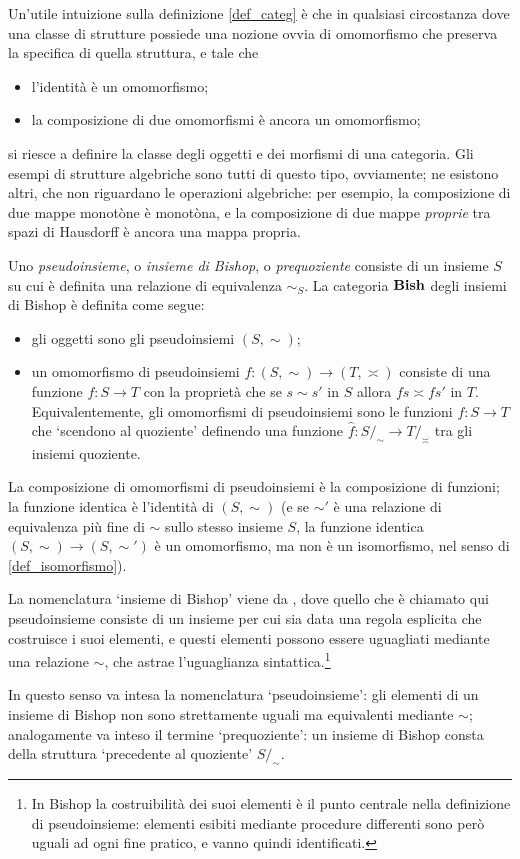 Un'utile intuizione sulla definizione \ref{def_categ} è che in qualsiasi circostanza dove una classe di strutture possiede una nozione ovvia di omomorfismo che preserva la specifica di quella struttura, e tale che
\begin{itemize}
	\item l'identità è un omomorfismo;
	\item la composizione di due omomorfismi è ancora un omomorfismo;
\end{itemize}
si riesce a definire la classe degli oggetti e dei morfismi di una categoria. Gli esempi di strutture algebriche sono tutti di questo tipo, ovviamente; ne esistono altri, che non riguardano le operazioni algebriche: per esempio, la composizione di due mappe monotòne è monotòna, e la composizione di due mappe \emph{proprie} tra spazi di Hausdorff è ancora una mappa propria.
\begin{example}
	Uno \emph{pseudoinsieme}, o \emph{insieme di Bishop}, o \emph{prequoziente} consiste di un insieme \(S\) su cui è definita una relazione di equivalenza \(\sim_S\). La categoria \(\mathbf{Bish}\) degli insiemi di Bishop è definita come segue:
	\begin{itemize}
		\item gli oggetti sono gli pseudoinsiemi \((S,\sim)\);
		\item un omomorfismo di pseudoinsiemi \(f : (S,\sim) \to (T,\asymp)\) consiste di una funzione \(f : S\to T\) con la proprietà che se \(s\sim s'\) in \(S\) allora \(fs\asymp fs'\) in \(T\). Equivalentemente, gli omomorfismi di pseudoinsiemi sono le funzioni \(f : S\to T\) che `scendono al quoziente' definendo una funzione \(\hat f : S/_\sim \to T/_\asymp\) tra gli insiemi quoziente.
	\end{itemize}
	La composizione di omomorfismi di pseudoinsiemi è la composizione di funzioni; la funzione identica è l'identità di \((S,\sim)\) (e se \(\sim'\) è una relazione di equivalenza più fine di \(\sim\) sullo stesso insieme \(S\), la funzione identica \((S,\sim) \to (S,\sim')\) è un omomorfismo, ma non è un isomorfismo, nel senso di \ref{def_isomorfismo}).
\end{example}
\begin{remark}
	La nomenclatura `insieme di Bishop' viene da \cite{Bishop1985}, dove quello che è chiamato qui pseudoinsieme consiste di un insieme per cui sia data una regola esplicita che costruisce i suoi elementi, e questi elementi possono essere uguagliati mediante una relazione \(\sim\), che astrae l'uguaglianza sintattica.\footnote{In Bishop la costruibilità dei suoi elementi è il punto centrale nella definizione di pseudoinsieme: elementi esibiti mediante procedure differenti sono però uguali ad ogni fine pratico, e vanno quindi identificati.}

	In questo senso va intesa la nomenclatura `pseudoinsieme': gli elementi di un insieme di Bishop non sono strettamente uguali ma equivalenti mediante \(\sim\); analogamente va inteso il termine `prequoziente': un insieme di Bishop consta della struttura `precedente al quoziente' \(S/_\sim\).
\end{remark}
